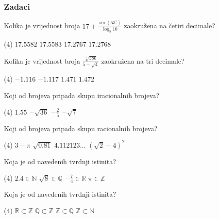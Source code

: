 \newpage

\subsubsection{Zadaci}

\begin{zadatak}
    Kolika je vrijednost broja $\displaystyle 17 + \frac{\sin (53^{\circ})}{\log_5 10}$ zaokružena na četiri decimale?
    \begin{tasks}(4)
		\task $17.5582$
		\task $17.5583$
		\task $17.2767$
		\task $17.2768$
	\end{tasks}
\end{zadatak}

\begin{zadatak}
    Kolika je vrijednost broja $\displaystyle \frac{\sqrt[4]{380}}{5-\sqrt {4}}$ zaokružena na tri decimale?
    \begin{tasks}(4)
		\task $-1.116$
		\task $-1.117$
		\task $1.471$
		\task $1.472$
	\end{tasks}
\end{zadatak}

\begin{zadatak}
    Koji od brojeva pripada skupu iracionalnih brojeva?
    \begin{tasks}(4)
		\task $1.55$
		\task $-\sqrt{36}$
		\task $-\displaystyle\frac{2}{5}$
		\task $-\sqrt{7}$
	\end{tasks}
\end{zadatak}

\begin{zadatak}
	Koji od brojeva pripada skupu racionalnih brojeva?
    \begin{tasks}(4)
		\task $3-\pi$
		\task $\sqrt{0.81}$
		\task $4.112123\ldots$
		\task $(\sqrt{2}-4)^2$
	\end{tasks}
\end{zadatak}

\begin{zadatak}
	Koja je od navedenih tvrdnji istinita?
    \begin{tasks}(4)
		\task $2.\dot{4} \in \mathbb{N}$
		\task $\sqrt{8} \in \mathbb{Q}$
		\task $\displaystyle -\frac{7}{4} \in \mathbb{R}$
		\task $\pi \in \mathbb{Z}$
	\end{tasks}
\end{zadatak}

\begin{zadatak}
	Koja je od navedenih tvrdnji istinita?
    \begin{tasks}(4)
		\task $\mathbb{R} \subset \mathbb{Z}$
		\task $\mathbb{Q} \subset \mathbb{Z}$
		\task $\mathbb{Z} \subset \mathbb{Q}$
		\task $\mathbb{Z} \subset \mathbb{N}$
	\end{tasks}
\end{zadatak}

